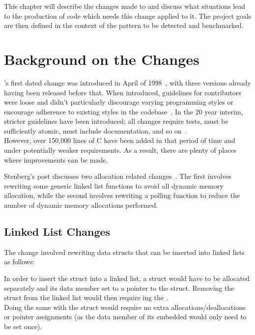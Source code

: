 This chapter will describe the changes made to  and discuss what situations lead to the production of code which needs this change applied to it. The project goals are then defined in the context of the pattern to be detected and benchmarked.

\section{Background on the Changes}\label{backgroundsec}

's first dated change was introduced in April of 1998~\cite{curlrelease}, with three versions already having been released before that. When introduced, guidelines for contributors were loose and didn't particularly discourage varying programming styles or encourage adherence to existing styles in the codebase~\cite{curlcontribute1999}. In the 20 year interim, stricter guidelines have been introduced; all changes require tests, must be sufficiently atomic, must include documentation, and so on~\cite{curlcontribute2017}.\\
However, over 150,000 lines of C have been added in that period of time and under potentially weaker requirements. As a result, there are plenty of places where improvements can be made.

Stenberg's post discusses two allocation related changes~\cite{curlmalloc}. The first involves rewriting some generic linked list functions to avoid all dynamic memory allocation, while the second involves rewriting a polling function to reduce the number of dynamic memory allocations performed.

\subsection{Linked List Changes}

The change involved rewriting data structs that can be inserted into linked lists as follows:



In order to insert the  struct into a linked list, a  struct would have to be allocated separately and its data member set to a pointer to the  struct. Removing the  struct from the linked list would then require \free{}ing the .\\
Doing the same with the  struct would require no extra allocations/deallocations or pointer assignments (as the data member of its embedded  would only need to be set once).

